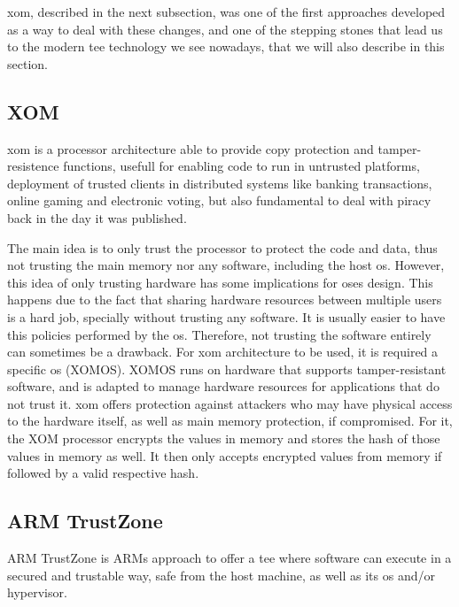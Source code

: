 \gls{xom}, described in the next subsection, was one of the first approaches developed as a way to deal with these changes, and one of the stepping stones that lead us to the modern \gls{tee} technology we see nowadays, that we will also describe in this section.

\subsection{XOM}
\label{ssec:xom}

\gls{xom} \cite{xomPaper} is a processor architecture able to provide copy protection and tamper-resistence functions, 
usefull for enabling code to run in untrusted platforms, deployment of trusted clients in distributed systems like banking transactions, online gaming and electronic voting, but also fundamental to deal with piracy back in the day it was published. 

The main idea is to only trust the processor to protect the code and data, thus not trusting the main memory nor any software, including the host \gls{os}.
However, this idea of only trusting hardware has some implications for \gls{os}es design. This happens due to the fact that sharing hardware resources between multiple users is a hard job, specially without trusting any software. It is usually easier to have this policies performed by the \gls{os}. Therefore, not trusting the software entirely can sometimes be a drawback.  
For \gls{xom} architecture to be used, it is required a specific \gls{os} (XOMOS). XOMOS runs on hardware that supports tamper-resistant software, and is adapted to manage hardware resources for applications that do not trust it.
\gls{xom} offers protection against attackers who may have physical access to the hardware itself, as well as main memory protection, if compromised. For it, the XOM processor encrypts the values in memory and stores the hash of those values in memory as well. It then only accepts encrypted values from memory if followed by a valid respective hash. 



\subsection{ARM TrustZone}
\label{ssec:armtz}

ARM TrustZone \cite{armTZPaper} is ARMs approach to offer a \gls{tee} where software can execute in a secured and trustable way, safe from the host machine, as well as its \gls{os} and/or hypervisor. 

